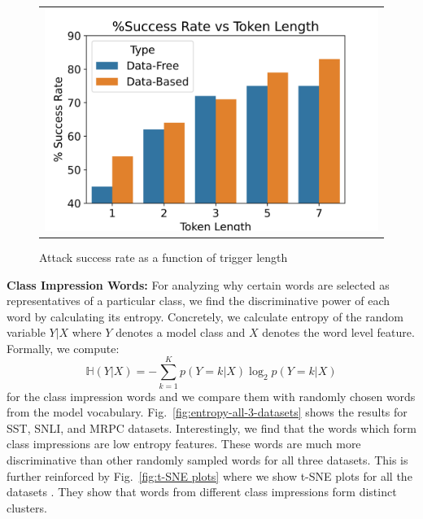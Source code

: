 \begin{figure}
\begin{tabular}{c}

\includegraphics[scale=0.5]{images/success_rate_vs_token_length.png}
 \end{tabular}

 \caption{Attack success rate as a function of trigger length \label{fig:attack-success-trigger-length}
 }

 \label{fig:Length}
\end{figure}


\textbf{Class Impression Words:} For analyzing why certain words are selected as representatives of a particular class, we find the discriminative power of each word by calculating its entropy. Concretely, we calculate entropy of the random variable $Y|X$ where $Y$ denotes a model class and $X$ denotes the word level feature. Formally, we compute:
\begin{equation}
    \mathbb{H}(Y|X) = -\sum_{k=1}^{K}p(Y=k|X)\log_2p(Y=k|X)
\end{equation}
for the class impression words and we compare them with randomly chosen words from the model vocabulary.
Fig.~\ref{fig:entropy-all-3-datasets} shows the results for SST, SNLI, and MRPC datasets. Interestingly, we find that the words which form class impressions are low entropy features. These words are much more discriminative than other randomly sampled words for all three datasets. This is further reinforced by Fig.~\ref{fig:t-SNE plots} where we show t-SNE plots for all the datasets . They show that words from different class impressions form distinct clusters. 









